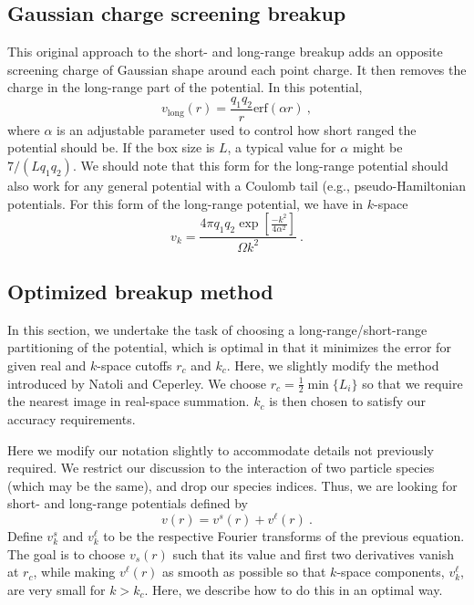 \subsection{Gaussian charge screening breakup}
This original approach to the short- and long-range breakup adds an
opposite screening charge of Gaussian shape around each point charge.
It then removes the charge in the long-range part of the potential.
In this potential,
\begin{equation}
v_{\text{long}}(r) = \frac{q_1 q_2}{r} \text{erf}(\alpha r)\:,
\end{equation}
where $\alpha$ is an adjustable parameter used to control how
short ranged the potential should be.  If the box size is $L$, a
typical value for $\alpha$ might be $7/(Lq_1 q_2)$. We should note
that this form for the long-range potential should also work for any
general potential with a Coulomb tail (e.g., pseudo-Hamiltonian
potentials.  For this form of the long-range potential, we have in $k$-space
\begin{equation}
v_k = \frac{4\pi q_1 q_2 \exp\left[\frac{-k^2}{4\alpha^2}\right]}{\Omega k^2}\:.
\end{equation}

\subsection{Optimized breakup method}
In this section, we undertake the task of choosing a
long-range/short-range partitioning of the potential, which is optimal
in that it minimizes the error for given real and $k$-space cutoffs
$r_c$ and $k_c$.  Here, we slightly modify the method introduced by
Natoli and Ceperley\cite{Natoli1995}. We choose $r_c =
\frac{1}{2}\min\{L_i\}$ so that we require the nearest image in
real-space summation.  $k_c$ is then chosen to satisfy our
accuracy requirements.

Here we modify our notation slightly to accommodate details not previously required.  We restrict our discussion to the interaction of two
particle species (which may be the same), and drop our species
indices.  Thus, we are looking for short- and long-range potentials
defined by
\renewcommand{\vs}{v^s}
\newcommand{\vl}{v^\ell}
\begin{equation}
v(r) = \vs(r) + \vl(r)\:.
\end{equation}
Define $\vs_k$ and $\vl_k$ to be the respective Fourier transforms of
the previous equation.  The goal is to choose $v_s(r)$ such that its value and
first two derivatives vanish at $r_c$, while making $\vl(r)$ as smooth as
possible so that $k$-space components, $\vl_k$, are very small for
$k>k_c$.  Here, we describe how to do this in an optimal way.

